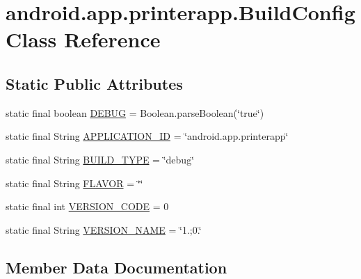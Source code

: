 \hypertarget{classandroid_1_1app_1_1printerapp_1_1_build_config}{}\section{android.\+app.\+printerapp.\+Build\+Config Class Reference}
\label{classandroid_1_1app_1_1printerapp_1_1_build_config}
\subsection*{Static Public Attributes}
\begin{DoxyCompactItemize}
\item 
static final boolean \hyperlink{classandroid_1_1app_1_1printerapp_1_1_build_config_a09bc5388565243c3291a0b5d0e91f70c}{D\+E\+B\+UG} = Boolean.\+parse\+Boolean(\char`\"{}true\char`\"{})
\item 
static final String \hyperlink{classandroid_1_1app_1_1printerapp_1_1_build_config_a6009cbedf16f3729e6e63db91e5d343d}{A\+P\+P\+L\+I\+C\+A\+T\+I\+O\+N\+\_\+\+ID} = \char`\"{}android.\+app.\+printerapp\char`\"{}
\item 
static final String \hyperlink{classandroid_1_1app_1_1printerapp_1_1_build_config_a86acd76eb32ab912ee204f2be0e6e3ab}{B\+U\+I\+L\+D\+\_\+\+T\+Y\+PE} = \char`\"{}debug\char`\"{}
\item 
static final String \hyperlink{classandroid_1_1app_1_1printerapp_1_1_build_config_a0339a447e29a4b2b6baec3d6adcc888b}{F\+L\+A\+V\+OR} = \char`\"{}\char`\"{}
\item 
static final int \hyperlink{classandroid_1_1app_1_1printerapp_1_1_build_config_a207271fa75f735341106489b435a8e71}{V\+E\+R\+S\+I\+O\+N\+\_\+\+C\+O\+DE} = 0
\item 
static final String \hyperlink{classandroid_1_1app_1_1printerapp_1_1_build_config_a34bad3f5a26b783539d4794f61423167}{V\+E\+R\+S\+I\+O\+N\+\_\+\+N\+A\+ME} = \char`\"{}1.;0.\char`\"{}
\end{DoxyCompactItemize}


\subsection{Member Data Documentation}
\mbox{\label{classandroid_1_1app_1_1printerapp_1_1_build_config_a6009cbedf16f3729e6e63db91e5d343d}} 
